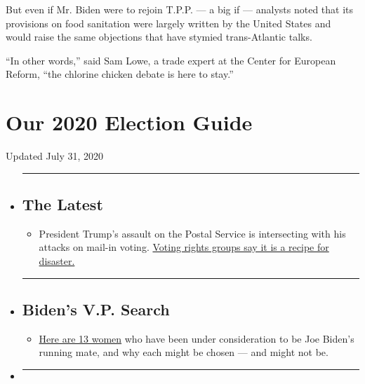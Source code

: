 But even if Mr. Biden were to rejoin T.P.P. --- a big if --- analysts
noted that its provisions on food sanitation were largely written by the
United States and would raise the same objections that have stymied
trans-Atlantic talks.

``In other words,'' said Sam Lowe, a trade expert at the Center for
European Reform, ``the chlorine chicken debate is here to stay.''

\hypertarget{our-2020-election-guide}{%
\section{Our 2020 Election Guide}\label{our-2020-election-guide}}

Updated July 31, 2020

\begin{itemize}
\item
  \begin{center}\rule{0.5\linewidth}{\linethickness}\end{center}

  \hypertarget{the-latest}{%
  \subsection{The Latest}\label{the-latest}}

  \begin{itemize}
  \tightlist
  \item
    President Trump's assault on the Postal Service is intersecting with
    his attacks on mail-in voting.
    \href{https://www.nytimes.com/2020/07/31/us/politics/trump-usps-mail-delays.html?action=click\&pgtype=Article\&state=default\&region=BELOW_MAIN_CONTENT\&context=storylines_guide}{Voting
    rights groups say it is a recipe for disaster.}
  \end{itemize}
\item
  \begin{center}\rule{0.5\linewidth}{\linethickness}\end{center}

  \hypertarget{bidens-vp-search}{%
  \subsection{Biden's V.P. Search}\label{bidens-vp-search}}

  \begin{itemize}
  \tightlist
  \item
    \href{https://www.nytimes.com/article/biden-vice-president-2020.html?action=click\&pgtype=Article\&state=default\&region=BELOW_MAIN_CONTENT\&context=storylines_guide}{Here
    are 13 women} who have been under consideration to be Joe Biden's
    running mate, and why each might be chosen --- and might not be.
  \end{itemize}
\item
  \begin{center}\rule{0.5\linewidth}{\linethickness}\end{center}


\end{itemize}
